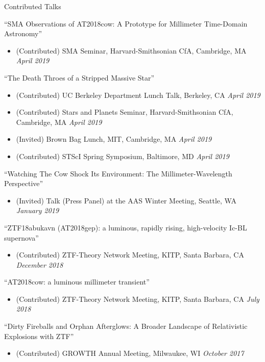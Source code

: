 \documentclass{resume} %
\begin{document}
\begin{rSection}{Contributed Talks}

``SMA Observations of AT2018cow: A Prototype for Millimeter Time-Domain Astronomy''
\begin{itemize}
  \item
    (Contributed) SMA Seminar, Harvard-Smithsonian CfA, Cambridge, MA
    \hfill {\em April 2019}
\end{itemize}

``The Death Throes of a Stripped Massive Star''
\begin{itemize}
  \item
    (Contributed) UC Berkeley Department Lunch Talk, Berkeley, CA
    \hfill {\em April 2019}
  \item
    (Contributed) Stars and Planets Seminar, Harvard-Smithsonian CfA, Cambridge, MA
    \hfill {\em April 2019}
  \item
    (Invited) Brown Bag Lunch, MIT, Cambridge, MA
    \hfill {\em April 2019}
  \item
    (Contributed) STScI Spring Symposium, Baltimore, MD
    \hfill {\em April 2019}
\end{itemize}

``Watching The Cow Shock Its Environment: The Millimeter-Wavelength Perspective''
\begin{itemize}
  \item
    (Invited) Talk (Press Panel) at the AAS Winter Meeting, Seattle, WA
    \hfill {\em January 2019}
\end{itemize}

``ZTF18abukavn (AT2018gep): a luminous, rapidly rising, high-velocity Ic-BL supernova''
\begin{itemize}
  \item
    (Contributed) ZTF-Theory Network Meeting, KITP, Santa Barbara, CA
    \hfill {\em December 2018}
\end{itemize}

``AT2018cow: a luminous millimeter transient''
\begin{itemize}
  \item
    (Contributed) ZTF-Theory Network Meeting, KITP, Santa Barbara, CA
    \hfill {\em July 2018}
\end{itemize}

``Dirty Fireballs and Orphan Afterglows: A Broader Landscape of Relativistic Explosions with ZTF''
\begin{itemize}
  \item
    (Contributed) GROWTH Annual Meeting, Milwaukee, WI
    \hfill {\em October 2017}
\end{itemize}


\end{rSection}
\end{document}
